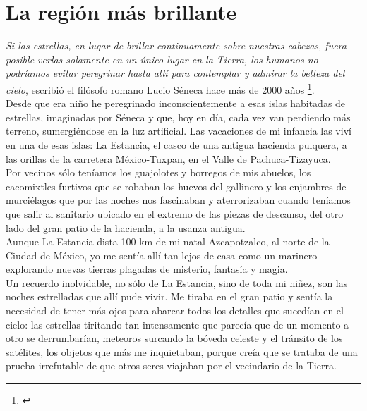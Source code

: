 \documentclass[letterpaper,11pt,oneside]{book}
\begin{document}
	
	
		
	\chapter*{La región más brillante}
	\BgThispage
	\textit{Si las estrellas, en lugar de brillar continuamente sobre nuestras cabezas, fuera posible verlas solamente en un único lugar en la Tierra, los humanos no podríamos evitar peregrinar hasta allí para contemplar y admirar la belleza del cielo}, escribió el filósofo romano Lucio Séneca hace más de 2000 años \footnote{\cite{Ribas2015}}.\\
	
	Desde que era niño he peregrinado inconscientemente a esas islas habitadas de estrellas, imaginadas por Séneca y que, hoy en día, cada vez van perdiendo más terreno, sumergiéndose en la luz artificial. Las vacaciones de mi infancia las viví en una de esas islas: La Estancia, el casco de una antigua hacienda pulquera, a las orillas de la carretera México-Tuxpan, en el Valle de Pachuca-Tizayuca.\\
	
	Por vecinos sólo teníamos los guajolotes y borregos de mis abuelos, los cacomixtles furtivos que se robaban los huevos del gallinero y los enjambres de murciélagos que por las noches nos fascinaban y aterrorizaban cuando teníamos que salir al sanitario ubicado en el extremo de las piezas de descanso, del otro lado del gran patio de la hacienda, a la usanza antigua.\\ 
	
	Aunque La Estancia dista 100 km de mi natal Azcapotzalco, al norte de la Ciudad de México, yo me sentía allí tan lejos de casa como un marinero explorando nuevas tierras plagadas de misterio, fantasía y magia.\\ 
	
	Un recuerdo inolvidable, no sólo de La Estancia, sino de toda mi niñez, son las noches estrelladas que allí pude vivir. Me tiraba en el gran patio y sentía la necesidad de tener más ojos para abarcar todos los detalles que sucedían en el cielo: las estrellas tiritando tan intensamente que parecía que de un momento a otro se derrumbarían, meteoros surcando la bóveda celeste y el tránsito de los satélites, los objetos que más me inquietaban, porque creía que se trataba de una prueba irrefutable de que otros seres viajaban por el vecindario de la Tierra.\\ 
	
\end{document}
